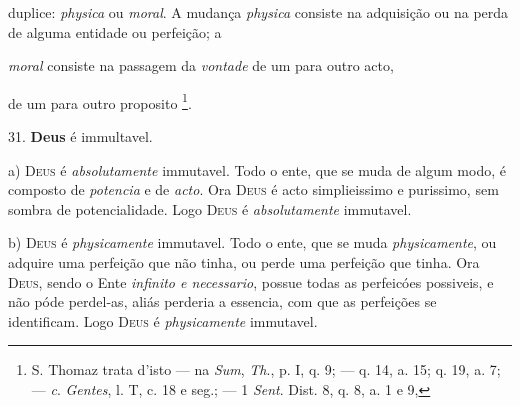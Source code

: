  duplice: \emph{physica} ou \emph{moral}. A mudança \emph{physica} consiste na adquisição ou na perda de alguma entidade ou perfeição; a

 \emph{moral} consiste na passagem da \emph{vontade} de um para outro acto,

de um para outro proposito \footnote{S. Thomaz trata d'isto --- na \emph{Sum}, \emph{Th}., p. I, q. 9; --- q. 14, a. 15; q. 19, a. 7; --- \emph{c}. \emph{Gentes}, l. T, c. 18 e seg.; --- 1 \emph{Sent}. Dist. 8, q. 8, a. 1 e 9,}.

31. \textbf{Deus} é immultavel.

a) \textsc{Deus} é \emph{absolutamente} immutavel. Todo o ente, que se muda de algum modo, é composto de \emph{potencia} e de \emph{acto}. Ora \textsc{Deus} é acto simplieissimo e purissimo, sem sombra de potencialidade. Logo \textsc{Deus} é \emph{absolutamente} immutavel.

b) \textsc{Deus} é \emph{physicamente} immutavel. Todo o ente, que se muda \emph{physicamente}, ou adquire uma perfeição que não tinha, ou perde uma perfeição que tinha. Ora \textsc{Deus}, sendo o Ente \emph{infinito e necessario}, possue todas as perfeicóes possiveis, e não póde perdel-as, aliás perderia a essencia, com que as perfeições se identificam. Logo \textsc{Deus} é \emph{physicamente} immutavel.

